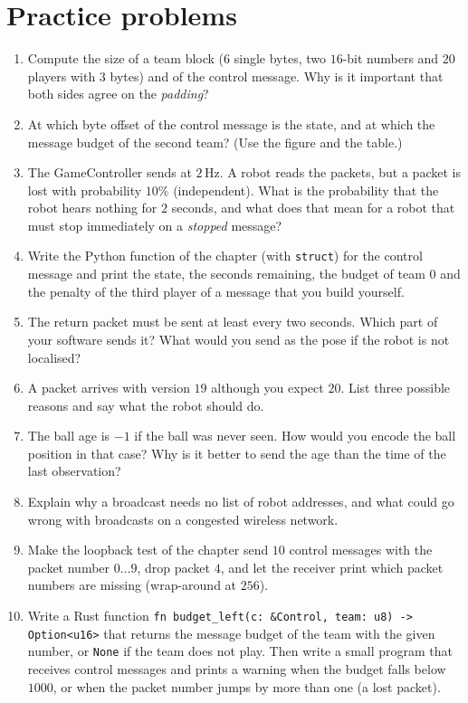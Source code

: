 \section*{Practice problems}
\begin{enumerate}[label=\textbf{\thechapter.\arabic*}]
  \item Compute the size of a team block ($6$ single bytes, two $16$-bit numbers and $20$ players with $3$ bytes) and of the control message. Why is it important that both sides agree on the \emph{padding}?
  \item At which byte offset of the control message is the state, and at which the message budget of the second team? (Use the figure and the table.)
  \item The GameController sends at $2$\,Hz. A robot reads the packets, but a packet is lost with probability $10\%$ (independent). What is the probability that the robot hears nothing for $2$ seconds, and what does that mean for a robot that must stop immediately on a \emph{stopped} message?
  \item Write the Python function of the chapter (with \verb!struct!) for the control message and print the state, the seconds remaining, the budget of team $0$ and the penalty of the third player of a message that you build yourself.
  \item The return packet must be sent at least every two seconds. Which part of your software sends it? What would you send as the pose if the robot is not localised?
  \item A packet arrives with version $19$ although you expect $20$. List three possible reasons and say what the robot should do.
  \item The ball age is $-1$ if the ball was never seen. How would you encode the ball position in that case? Why is it better to send the age than the time of the last observation?
  \item Explain why a broadcast needs no list of robot addresses, and what could go wrong with broadcasts on a congested wireless network.
  \item Make the loopback test of the chapter send $10$ control messages with the packet number $0\dots9$, drop packet $4$, and let the receiver print which packet numbers are missing (wrap-around at $256$).
  \item[\textbf{\thechapter.10}$\star$] Write a Rust function \verb!fn budget_left(c: &Control, team: u8) -> Option<u16>! that returns the message budget of the team with the given number, or \verb!None! if the team does not play. Then write a small program that receives control messages and prints a warning when the budget falls below $1000$, or when the packet number jumps by more than one (a lost packet).
\end{enumerate}
